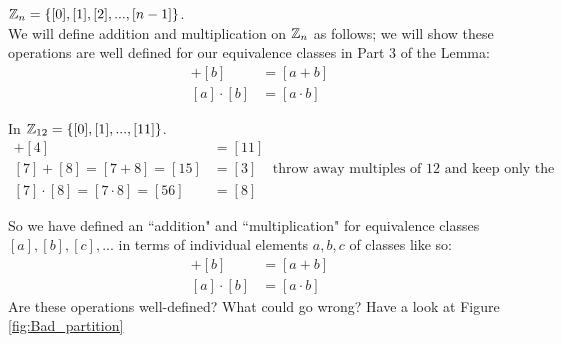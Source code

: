 ${\mathbb{Z}}_n=\{[0],[1],[2],...,[n-1]\}$.\\
\noindent We will define addition and multiplication on ${\mathbb{Z}}_n$ as follows; we will show these
operations are well defined for our equivalence classes in Part 3 of the Lemma:
\begin{align}
    [a]+[b]&=[a+b] \nonumber \\
    [a]\cdot[b]&=[a\cdot b] \nonumber
\end{align}
\begin{example}
In ${\mathbb{Z}}_{12}=\{[0],[1],...,[11]\}$.
\begin{align}
    [7]+[4]&=[11]\nonumber \\
    [7]+[8]=[7+8]=[15]&=[3] \ \ \ \ \ \text{throw away multiples of 12 and keep only the remainder.}\nonumber \\
    [7]\cdot[8]=[7\cdot 8]=[56]&=[8] \nonumber
\end{align}
\end{example}
\noindent So we have defined an ``addition" and ``multiplication" for equivalence classes
$[a],[b],[c], ...$ in terms of individual elements $a,b,c$  of classes like so:
\begin{align}
    [a]+[b]&=[a+b] \nonumber \\
    [a]\cdot[b]&=[a\cdot b] \nonumber
\end{align}
Are these operations well-defined?  What could go wrong? Have a look at Figure
\ref{fig:Bad_partition}\steezybreak

